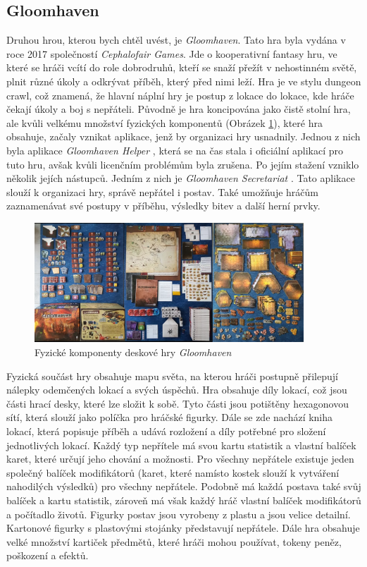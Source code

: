 \subsection{Gloomhaven}
Druhou hrou, kterou bych chtěl uvést, je \textit{Gloomhaven}. Tato hra byla vydána v roce 2017 společností \textit{Cephalofair Games}. Jde o kooperativní fantasy hru, ve které se hráči vcítí do role dobrodruhů, kteří se snaží přežít v nehostinném světě, plnit různé úkoly a odkrývat příběh, který před nimi leží. Hra je ve stylu dungeon crawl, což znamená, že hlavní náplní hry je postup z lokace do lokace, kde hráče čekají úkoly a boj s nepřáteli. Původně je hra koncipována jako čistě stolní hra, ale kvůli velkému množství fyzických komponentů (Obrázek \ref{fig:gloomhaven_contents}), které hra obsahuje, začaly vznikat aplikace, jenž by organizaci hry usnadnily. Jednou z nich byla aplikace \textit{Gloomhaven Helper} \cite{gloomhaven_helper}, která se na čas stala i oficiální aplikací pro tuto hru, avšak kvůli licenčním problémům byla zrušena. Po jejím stažení vzniklo několik jejích nástupců. Jedním z nich je \textit{Gloomhaven Secretariat} \cite{gloomhaven_secretariat}. Tato aplikace slouží k organizaci hry, správě nepřátel i postav. Také umožňuje hráčům zaznamenávat své postupy v příběhu, výsledky bitev a další herní prvky.

\begin{figure}[H]
    \centering
    \includegraphics[width=0.9\textwidth]{resources/figures/gloomhaven.png}
    \caption{Fyzické komponenty deskové hry \textit{Gloomhaven} \cite{gloomhaven}}
    \label{fig:gloomhaven_contents}
\end{figure}

Fyzická součást hry obsahuje mapu světa, na kterou hráči postupně přilepují nálepky odemčených lokací a svých úspěchů. Hra obsahuje díly lokací, což jsou části hrací desky, které lze složit k sobě. Tyto části jsou potištěny hexagonovou sítí, která slouží jako políčka pro hráčské figurky. Dále se zde nachází kniha lokací, která popisuje příběh a udává rozložení a díly potřebné pro složení jednotlivých lokací. Každý typ nepřítele má svou kartu statistik a vlastní balíček karet, které určují jeho chování a možnosti. Pro všechny nepřátele existuje jeden společný balíček modifikátorů (karet, které namísto kostek slouží k vytváření nahodilých výsledků) pro všechny nepřátele. Podobně má každá postava také svůj balíček a kartu statistik, zároveň má však každý hráč vlastní balíček modifikátorů a počítadlo životů. Figurky postav jsou vyrobeny z plastu a jsou velice detailní. Kartonové figurky s plastovými stojánky představují nepřátele. Dále hra obsahuje velké množství kartiček předmětů, které hráči mohou používat, tokeny peněz, poškození a efektů.